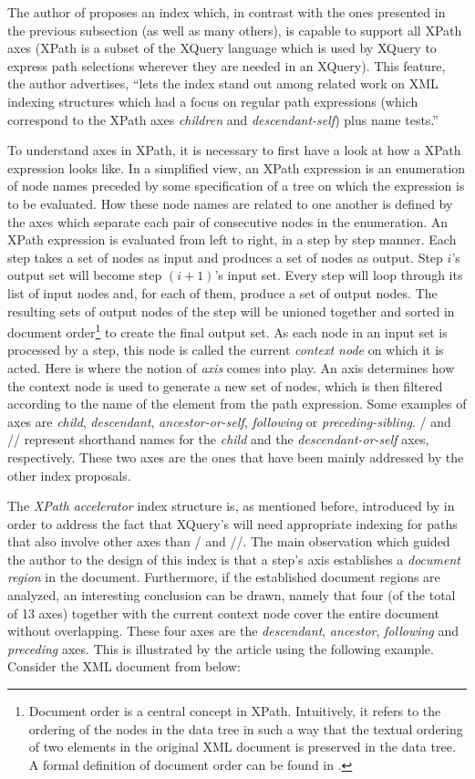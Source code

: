 \documentclass[a4paper,10pt]{article}
\begin{document}
The author of \cite{gru02} proposes an index which, in contrast with the ones presented in the previous
subsection (as well as many others), is capable to support all XPath axes (XPath is a subset of the XQuery
language which is used by XQuery to express path selections wherever they are needed in an XQuery).
This feature, the author advertises, ``lets the index stand out among related work on XML indexing
structures which had a focus on regular path expressions (which correspond to the XPath axes \textit{children}
and \textit{descendant-self}) plus name tests.''

To understand axes in XPath, it is necessary to first have a look at how a XPath expression looks like.
In a simplified view, an XPath expression is an enumeration of node names preceded by some specification
of a tree on which the expression is to be evaluated. How these node names are related to one another
is defined by the axes which separate each pair of consecutive nodes in the enumeration. An XPath
expression is evaluated from left to right, in a step by step manner. Each step takes a set of nodes as
input and produces a set of nodes as output. Step $i$'s output set will become step $(i+1)$'s input set.
Every step will loop through its list of input nodes and, for each of them, produce a set of output nodes.
The resulting sets of output nodes of the step will be unioned together and sorted in document order\footnote[1]
{Document order is a central concept in XPath. Intuitively, it refers to the ordering of the
nodes in the data tree in such a way that the textual ordering of two elements in the original XML
document is preserved in the data tree. A formal definition of document order can be found in \cite{w3cdm}.}
to create the final output set. As each node in an input set is processed by a step, this node is called
the current \textit{context node} on which it is acted. Here is where the notion of \textit{axis} comes
into play. An axis determines how the context node is used to generate a new set of nodes, which is then
filtered according to the name of the element from the path expression. Some examples of axes are
\textit{child}, \textit{descendant}, \textit{ancestor-or-self}, \textit{following} or \textit{preceding-sibling}.
/ and // represent shorthand names for the \textit{child} and the \textit{descendant-or-self} axes,
respectively. These two axes are the ones that have been mainly addressed by the other index proposals.

The \textit{XPath accelerator} index structure is, as mentioned before, introduced by \cite{gru02} in
order to address the fact that XQuery's will need appropriate indexing for paths that also involve
other axes than / and //. The main observation which guided the author to the design of this index is
that a step's axis establishes a \textit{document region} in the document. Furthermore, if the established
document regions are analyzed, an interesting conclusion can be drawn, namely that four (of the total of
13 axes) together with the current context node cover the entire document without overlapping. These four
axes are the \textit{descendant}, \textit{ancestor}, \textit{following} and \textit{preceding} axes.
This is illustrated by the article using the following example. Consider the XML document from below:
\end{document}
